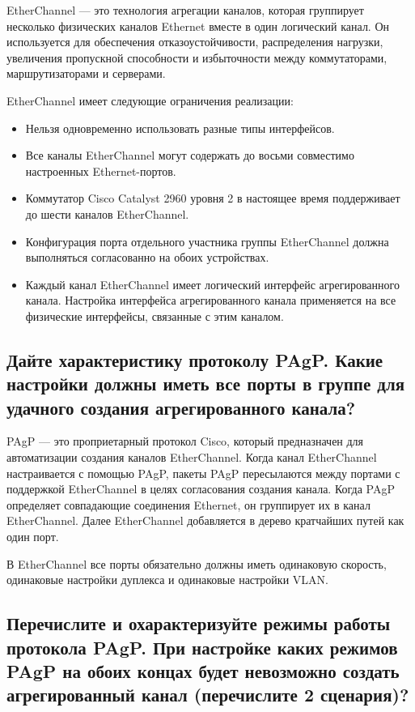 EtherChannel — это технология агрегации каналов, которая
группирует несколько физических каналов Ethernet вместе в один логический
канал. Он используется для обеспечения отказоустойчивости, распределения
нагрузки, увеличения пропускной способности и избыточности между
коммутаторами, маршрутизаторами и серверами.

EtherChannel имеет следующие ограничения реализации:
\begin{itemize}
    \item Нельзя одновременно использовать разные типы интерфейсов.
    \item Все каналы EtherChannel могут содержать до восьми совместимо
    настроенных Ethernet-портов.
    \item Коммутатор Cisco Catalyst 2960 уровня 2 в настоящее время
    поддерживает до шести каналов EtherChannel.
    \item Конфигурация порта отдельного участника группы EtherChannel
    должна выполняться согласованно на обоих устройствах.
    \item Каждый канал EtherChannel имеет логический интерфейс
    агрегированного канала. Настройка интерфейса агрегированного
    канала применяется на все физические интерфейсы, связанные с этим
    каналом.
\end{itemize}

\subsection{Дайте характеристику протоколу PAgP. Какие настройки
должны иметь все порты в группе для удачного создания
агрегированного канала?}

PAgP — это проприетарный протокол Cisco, который предназначен
для автоматизации создания каналов EtherChannel. Когда канал EtherChannel
настраивается с помощью PAgP, пакеты PAgP пересылаются между портами
с поддержкой EtherChannel в целях согласования создания канала. Когда
PAgP определяет совпадающие соединения Ethernet, он группирует их в
канал EtherChannel. Далее EtherChannel добавляется в дерево кратчайших
путей как один порт.

В EtherChannel все порты обязательно должны иметь одинаковую
скорость, одинаковые настройки дуплекса и одинаковые настройки VLAN.

\subsection{Перечислите и охарактеризуйте режимы работы протокола
PAgP. При настройке каких режимов PAgP на обоих концах
будет невозможно создать агрегированный канал (перечислите 2
сценария)?}

